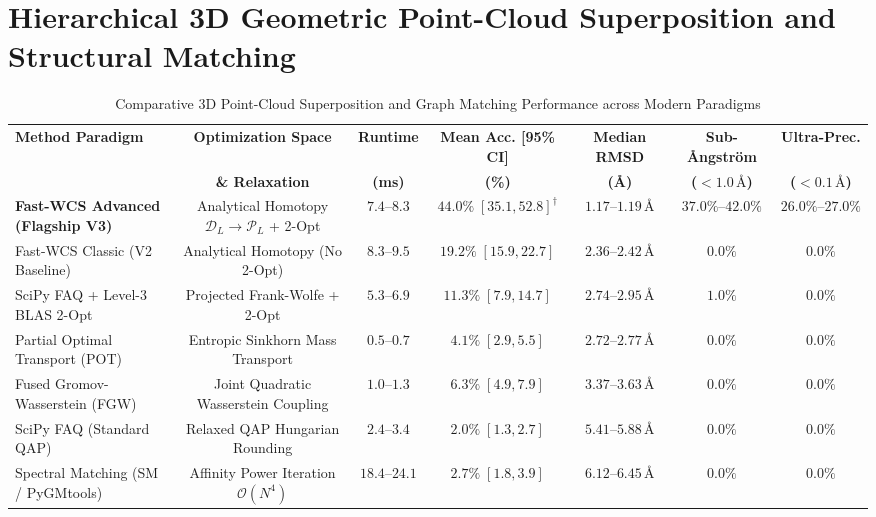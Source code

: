 \documentclass[conference]{IEEEtran}
\begin{document}

\section{Hierarchical 3D Geometric Point-Cloud Superposition and Structural Matching}
\label{sec:3d_superposition}

\begin{table}[t]
\centering
\caption{Comparative 3D Point-Cloud Superposition and Graph Matching Performance across Modern Paradigms}
\label{tab:3d_comparative_summary}
\fontsize{6.8}{8.2}\selectfont
\setlength{\tabcolsep}{3.0pt}
\begin{tabular*}{\textwidth}{@{\extracolsep{\fill}}lcccccc@{}}
\toprule
\textbf{Method Paradigm} & \textbf{Optimization Space} & \textbf{Runtime} & \textbf{Mean Acc. [95\% CI]} & \textbf{Median RMSD} & \textbf{Sub-\AA ngstr{\"o}m} & \textbf{Ultra-Prec.} \\
& \textbf{\& Relaxation} & \textbf{(ms)} & \textbf{(\%)} & \textbf{(\AA)} & \textbf{($< 1.0\,\text{\AA}$)} & \textbf{($< 0.1\,\text{\AA}$)} \\
\midrule
\textbf{Fast-WCS Advanced (Flagship V3)} & Analytical Homotopy $\mathcal{D}_L \to \mathcal{P}_L$ + 2-Opt & $\mathbf{7.4\text{--}8.3}$ & $\mathbf{44.0\% \; [35.1, 52.8]^\dagger}$ & $\mathbf{1.17\text{--}1.19\,\text{\AA}}$ & $\mathbf{37.0\%\text{--}42.0\%}$ & $\mathbf{26.0\%\text{--}27.0\%}$ \\
Fast-WCS Classic (V2 Baseline) & Analytical Homotopy (No 2-Opt) & $8.3\text{--}9.5$ & $19.2\% \; [15.9, 22.7]$ & $2.36\text{--}2.42\,\text{\AA}$ & $0.0\%$ & $0.0\%$ \\
SciPy FAQ + Level-3 BLAS 2-Opt \cite{vogelstein2015fast} & Projected Frank-Wolfe + 2-Opt & $5.3\text{--}6.9$ & $11.3\% \; [7.9, 14.7]$ & $2.74\text{--}2.95\,\text{\AA}$ & $1.0\%$ & $0.0\%$ \\
Partial Optimal Transport (POT) \cite{peyre2019computational} & Entropic Sinkhorn Mass Transport & $\mathbf{0.5\text{--}0.7}$ & $4.1\% \; [2.9, 5.5]$ & $2.72\text{--}2.77\,\text{\AA}$ & $0.0\%$ & $0.0\%$ \\
Fused Gromov-Wasserstein (FGW) \cite{titouan2019optimal} & Joint Quadratic Wasserstein Coupling & $1.0\text{--}1.3$ & $6.3\% \; [4.9, 7.9]$ & $3.37\text{--}3.63\,\text{\AA}$ & $0.0\%$ & $0.0\%$ \\
SciPy FAQ (Standard QAP) \cite{vogelstein2015fast} & Relaxed QAP Hungarian Rounding & $2.4\text{--}3.4$ & $2.0\% \; [1.3, 2.7]$ & $5.41\text{--}5.88\,\text{\AA}$ & $0.0\%$ & $0.0\%$ \\
Spectral Matching (SM / PyGMtools) \cite{leordeanu2005} & Affinity Power Iteration $\mathcal{O}(N^4)$ & $18.4\text{--}24.1$ & $2.7\% \; [1.8, 3.9]$ & $6.12\text{--}6.45\,\text{\AA}$ & $0.0\%$ & $0.0\%$ \\
\bottomrule
\end{tabular*}
\end{table}
\end{document}
